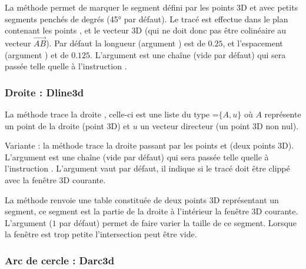 La méthode  permet de marquer le segment défini par les points 3D  et  avec  petits segments penchés de  degrés (45° par défaut). Le tracé est effectue dans le plan contenant les points ,  et le vecteur 3D  (qui ne doit donc pas être colinéaire au vecteur $\vec{AB}$). Par défaut la longueur (argument ) est de $0.25$, et l'espacement (argument ) et de $0.125$. L'argument  est une chaîne (vide par défaut) qui sera passée telle quelle à l'instruction \drawcmd.
    
\subsubsection{Droite : Dline3d}

La méthode  trace la droite , celle-ci est une liste du type =$\{A,u\}$ où $A$ représente un point de la droite (point 3D) et $u$ un vecteur directeur (un point 3D non nul). 

Variante : la méthode  trace la droite passant par les points  et  (deux points 3D). L'argument  est une chaîne (vide par défaut) qui sera passée telle quelle à l'instruction \drawcmd . L'argument  vaut \false par défaut, il indique si le tracé doit être clippé avec la fenêtre 3D courante.

La méthode  renvoie une table constituée de deux points 3D représentant un segment, ce segment est la partie de la droite  à l'intérieur la fenêtre 3D courante. L'argument  ($1$ par défaut) permet de faire varier la taille de ce segment. Lorsque la fenêtre est trop petite l'intersection peut être vide.

\subsubsection{Arc de cercle : Darc3d}
 
